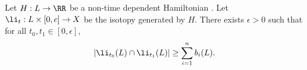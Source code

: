 

    Let $H: L\to \RR$ be a non-time dependent Hamiltonian .
    Let $\li_t: L\times[0, c]\to X$ be the isotopy generated by $H$. 
    There exists $\epsilon>0$ such that for all $t_0, t_1\in [0, \epsilon]$, 
    \begin{align*}
        |\li_{t_0}(L)\cap \li_{t_1}(L)|\geq \sum_{i=1}^n b_i(L).
    \end{align*}

